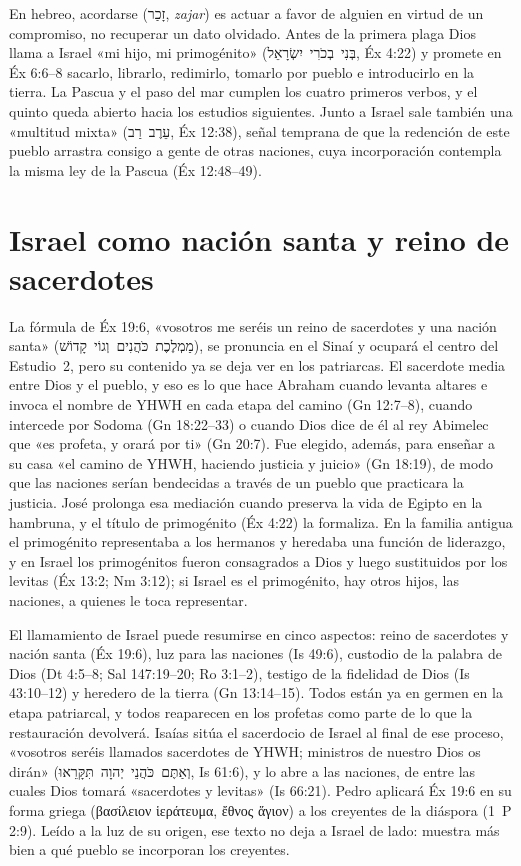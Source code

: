\documentclass[11pt,letterpaper]{article}
\newcommand{\heb}[1]{\mbox{\foreignlanguage{hebrew}{#1}}}
\newcommand{\grc}[1]{\foreignlanguage{ancientgreek}{#1}}
\begin{document}
En hebreo, acordarse (\heb{זָכַר}, \emph{zajar}) es actuar a favor de alguien en virtud de un compromiso, no recuperar un dato olvidado. Antes de la primera plaga Dios llama a Israel «mi hijo, mi primogénito» (\heb{בְּנִי בְכֹרִי יִשְׂרָאֵל}, Éx 4:22) y promete en Éx 6:6–8 sacarlo, librarlo, redimirlo, tomarlo por pueblo e introducirlo en la tierra. La Pascua y el paso del mar cumplen los cuatro primeros verbos, y el quinto queda abierto hacia los estudios siguientes. Junto a Israel sale también una «multitud mixta» (\heb{עֵרֶב רַב}, Éx 12:38), señal temprana de que la redención de este pueblo arrastra consigo a gente de otras naciones, cuya incorporación contempla la misma ley de la Pascua (Éx 12:48–49).

\section{Israel como nación santa y reino de sacerdotes}

La fórmula de Éx 19:6, «vosotros me seréis un reino de sacerdotes y una nación santa» (\heb{מַמְלֶכֶת כֹּהֲנִים וְגוֹי קָדוֹשׁ}), se pronuncia en el Sinaí y ocupará el centro del Estudio~2, pero su contenido ya se deja ver en los patriarcas. El sacerdote media entre Dios y el pueblo, y eso es lo que hace Abraham cuando levanta altares e invoca el nombre de YHWH en cada etapa del camino (Gn 12:7–8), cuando intercede por Sodoma (Gn 18:22–33) o cuando Dios dice de él al rey Abimelec que «es profeta, y orará por ti» (Gn 20:7). Fue elegido, además, para enseñar a su casa «el camino de YHWH, haciendo justicia y juicio» (Gn 18:19), de modo que las naciones serían bendecidas a través de un pueblo que practicara la justicia. José prolonga esa mediación cuando preserva la vida de Egipto en la hambruna, y el título de primogénito (Éx 4:22) la formaliza. En la familia antigua el primogénito representaba a los hermanos y heredaba una función de liderazgo, y en Israel los primogénitos fueron consagrados a Dios y luego sustituidos por los levitas (Éx 13:2; Nm 3:12); si Israel es el primogénito, hay otros hijos, las naciones, a quienes le toca representar.

El llamamiento de Israel puede resumirse en cinco aspectos: reino de sacerdotes y nación santa (Éx 19:6), luz para las naciones (Is 49:6), custodio de la palabra de Dios (Dt 4:5–8; Sal 147:19–20; Ro 3:1–2), testigo de la fidelidad de Dios (Is 43:10–12) y heredero de la tierra (Gn 13:14–15). Todos están ya en germen en la etapa patriarcal, y todos reaparecen en los profetas como parte de lo que la restauración devolverá. Isaías sitúa el sacerdocio de Israel al final de ese proceso, «vosotros seréis llamados sacerdotes de YHWH; ministros de nuestro Dios os dirán» (\heb{וְאַתֶּם כֹּהֲנֵי יְהוָה תִּקָּרֵאוּ}, Is 61:6), y lo abre a las naciones, de entre las cuales Dios tomará «sacerdotes y levitas» (Is 66:21). Pedro aplicará Éx 19:6 en su forma griega (\grc{βασίλειον ἱεράτευμα, ἔθνος ἅγιον}) a los creyentes de la diáspora (1~P 2:9). Leído a la luz de su origen, ese texto no deja a Israel de lado: muestra más bien a qué pueblo se incorporan los creyentes.
\end{document}
